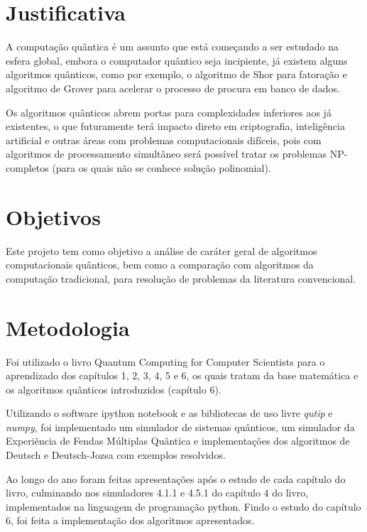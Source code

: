 \documentclass[inci]{imetex}
\begin{document}
\section{Justificativa}
A computação quântica é um assunto que está começando a ser estudado na esfera global, embora o computador quântico seja incipiente, já existem alguns algoritmos quânticos, como por exemplo, o algoritmo de Shor para fatoração e algoritmo de Grover para acelerar o processo de procura em banco de dados.
 
Os algoritmos quânticos abrem portas para complexidades inferiores aos já existentes, o que futuramente terá impacto direto em criptografia, inteligência artificial e outras áreas com problemas computacionais difíceis, pois com algoritmos de processamento simultâneo será possível tratar os problemas NP-completos (para os quais não se conhece solução polinomial).

\section{Objetivos}
Este projeto tem como objetivo a análise de caráter geral de algoritmos computacionais quânticos, bem como a comparação com algoritmos da computação tradicional, para resolução de problemas da literatura convencional.

\section{Metodologia}
Foi utilizado o livro Quantum Computing for Computer Scientists para o aprendizado dos capítulos 1, 2, 3, 4, 5 e 6, os quais tratam da base matemática e os algoritmos quânticos introduzidos (capítulo 6).

Utilizando o software ipython notebook e as bibliotecas de uso livre \emph{qutip} e \emph{numpy}, foi implementado um simulador de sistemas quânticos, um simulador da Experiência de Fendas Múltiplas Quântica e implementações dos algoritmos de Deutsch e Deutsch-Jozsa com exemplos resolvidos.

Ao longo do ano foram feitas apresentações após o estudo de cada capítulo do livro, culminando nos simuladores 4.1.1 e 4.5.1 do capítulo 4 do livro, implementados na linguagem de programação python. Findo o estudo do capítulo 6, foi feita a implementação dos algoritmos apresentados.
\end{document}

